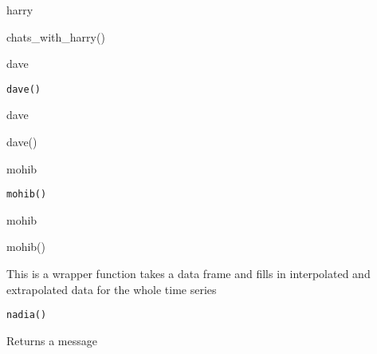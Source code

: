 \documentclass[a4paper]{book}
\begin{document}
%
\begin{Author}\relax
harry
\end{Author}
%
\begin{Examples}
\begin{ExampleCode}
chats_with_harry()

\end{ExampleCode}
\end{Examples}
%
\begin{Description}\relax
dave
\end{Description}
%
\begin{Usage}
\begin{verbatim}
dave()
\end{verbatim}
\end{Usage}
%
\begin{Author}\relax
dave
\end{Author}
%
\begin{Examples}
\begin{ExampleCode}
dave()

\end{ExampleCode}
\end{Examples}
%
\begin{Description}\relax
mohib
\end{Description}
%
\begin{Usage}
\begin{verbatim}
mohib()
\end{verbatim}
\end{Usage}
%
\begin{Author}\relax
mohib
\end{Author}
%
\begin{Examples}
\begin{ExampleCode}
mohib()

\end{ExampleCode}
\end{Examples}
%
\begin{Description}\relax
This is a wrapper function takes a data frame and fills in
interpolated and extrapolated data for the whole time series
\end{Description}
%
\begin{Usage}
\begin{verbatim}
nadia()
\end{verbatim}
\end{Usage}
%
\begin{Value}
Returns a message
\end{Value}
\end{document}
